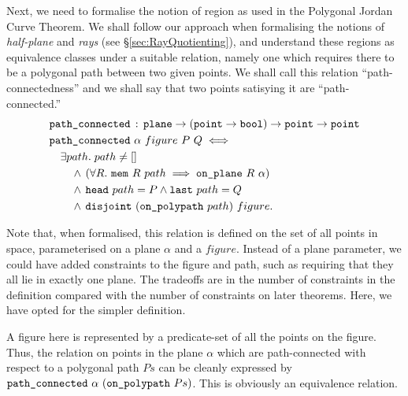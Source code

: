 Next, we need to formalise the notion of region as used in the Polygonal Jordan Curve Theorem. We shall follow our approach when formalising the notions of \emph{half-plane} and \emph{rays} (see \S\ref{sec:RayQuotienting}), and understand these regions as equivalence classes under a suitable relation, namely one which requires there to be a polygonal path between two given points. We shall call this relation ``path-connectedness'' and we shall say that two points satisying it are ``path-connected.''
\begin{align*}
  &\code{path\_connected}\,:\,\code{plane}\rightarrow(\code{point} \rightarrow \code{bool}) \rightarrow    \code{point} \rightarrow \code{point}\\
  &\code{path\_connected}\ \alpha\ figure\ P\ Q \iff\\
  &\quad\exists path.\; path \neq []\\
  &\qquad\wedge\,(\forall R.\ \code{mem}\ R\ path \implies \onplane{R}{\alpha})\\
  &\qquad\wedge\,\code{head}\ path = P \wedge \code{last}\ path = Q\\
  &\qquad\wedge\,\code{disjoint}\ (\code{on\_polypath}\ path)\ figure.
\end{align*}

Note that, when formalised, this relation is defined on the set of all points in space, parameterised on a plane $\alpha$ and a $figure$. Instead of a plane parameter, we could have added constraints to the figure and path, such as requiring that they all lie in exactly one plane. The tradeoffs are in the number of constraints in the definition compared with the number of constraints on later theorems. Here, we have opted for the simpler definition.

A figure here is represented by a predicate-set of all the points on the figure. Thus, the relation on points in the plane $\alpha$ which are path-connected with respect to a polygonal path $Ps$ can be cleanly expressed by $\code{path\_connected}\ \alpha\ (\code{on\_polypath}\ Ps)$. This is obviously an equivalence relation.

